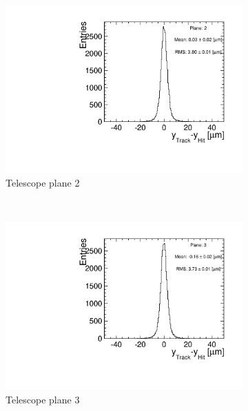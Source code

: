 \begin{figure}[htbp]
\begin{subfigure}[b]{0.3\textwidth}
    \includegraphics[width=\textwidth]{figures/Telescope/biasedResiduals/BiasedResiduals_run661_PlaneYRMS2.pdf}
    \caption{Telescope  plane 2}
  \end{subfigure} \\
  \begin{subfigure}[b]{0.3\textwidth}
    \includegraphics[width=\textwidth]{figures/Telescope/biasedResiduals/BiasedResiduals_run661_PlaneYRMS3.pdf}
    \caption{Telescope  plane 3}
  \end{subfigure}\hfill
  \begin{subfigure}[b]{0.3\textwidth}

\end{subfigure}
\end{figure}

